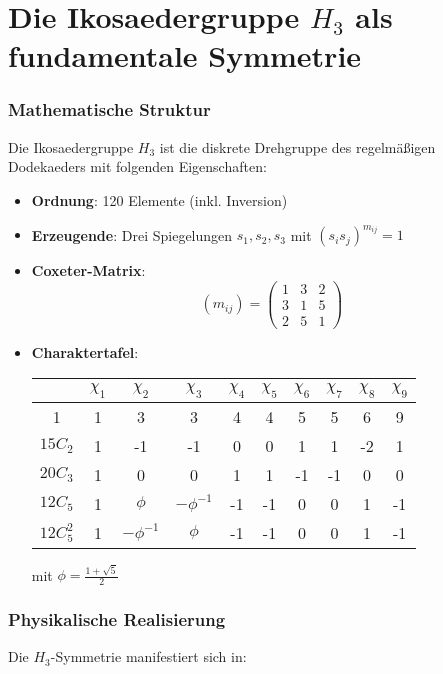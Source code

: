 \newpage
\section{Die Ikosaedergruppe $H_3$ als fundamentale Symmetrie}
\label{subsec:h3_symmetry}

\subsubsection{Mathematische Struktur}
Die Ikosaedergruppe $H_3$ ist die diskrete Drehgruppe des regelmäßigen Dodekaeders mit folgenden Eigenschaften:

\begin{itemize}
    \item \textbf{Ordnung}: 120 Elemente (inkl. Inversion)
    \item \textbf{Erzeugende}: Drei Spiegelungen $s_1, s_2, s_3$ mit $(s_is_j)^{m_{ij}} = 1$
    \item \textbf{Coxeter-Matrix}:
    \[
    (m_{ij}) = \begin{pmatrix}
    1 & 3 & 2 \\
    3 & 1 & 5 \\
    2 & 5 & 1
    \end{pmatrix}
    \]
    \item \textbf{Charaktertafel}:
    
    \begin{tabular}{c|ccccccccc}
    & $\chi_1$ & $\chi_2$ & $\chi_3$ & $\chi_4$ & $\chi_5$ & $\chi_6$ & $\chi_7$ & $\chi_8$ & $\chi_9$ \\
    \hline
    1 & 1 & 3 & 3 & 4 & 4 & 5 & 5 & 6 & 9 \\
    $15C_2$ & 1 & -1 & -1 & 0 & 0 & 1 & 1 & -2 & 1 \\
    $20C_3$ & 1 & 0 & 0 & 1 & 1 & -1 & -1 & 0 & 0 \\
    $12C_5$ & 1 & $\phi$ & $-\phi^{-1}$ & -1 & -1 & 0 & 0 & 1 & -1 \\
    $12C_5^2$ & 1 & $-\phi^{-1}$ & $\phi$ & -1 & -1 & 0 & 0 & 1 & -1 \\
    \end{tabular}
    mit $\phi = \frac{1+\sqrt{5}}{2}$
\end{itemize}

\subsubsection{Physikalische Realisierung}
Die $H_3$-Symmetrie manifestiert sich in:

